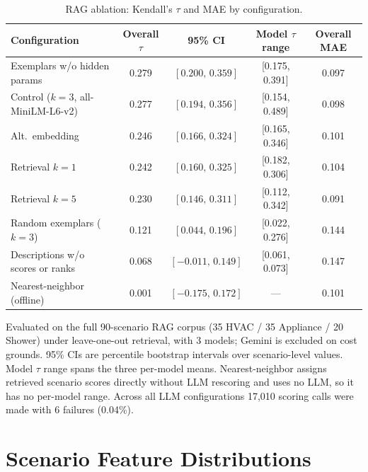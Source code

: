 \documentclass[final,3p,times]{elsarticle}
\begin{document}
\begin{table}[t]
\begin{threeparttable}
\small
\centering
\renewcommand{\arraystretch}{1.15}
\begin{tabular}{lcccc}
\toprule
Configuration & Overall $\tau$ & 95\% CI & Model $\tau$ range & Overall MAE \\
\midrule
Exemplars w/o hidden params & 0.279 & $[0.200,\, 0.359]$ & [0.175, 0.391] & 0.097 \\
Control ($k=3$, all-MiniLM-L6-v2) & 0.277 & $[0.194,\, 0.356]$ & [0.154, 0.489] & 0.098 \\
Alt.\ embedding & 0.246 & $[0.166,\, 0.324]$ & [0.165, 0.346] & 0.101 \\
Retrieval $k=1$ & 0.242 & $[0.160,\, 0.325]$ & [0.182, 0.306] & 0.104 \\
Retrieval $k=5$ & 0.230 & $[0.146,\, 0.311]$ & [0.112, 0.342] & 0.091 \\
Random exemplars ($k=3$) & 0.121 & $[0.044,\, 0.196]$ & [0.022, 0.276] & 0.144 \\
Descriptions w/o scores or ranks & 0.068 & $[-0.011,\, 0.149]$ & [0.061, 0.073] & 0.147 \\
\midrule
Nearest-neighbor (offline) & 0.001 & $[-0.175,\, 0.172]$ & --- & 0.101 \\
\bottomrule
\end{tabular}
\renewcommand{\arraystretch}{1.0}
\begin{tablenotes}
\item Evaluated on the full 90-scenario RAG corpus (35 HVAC / 35 Appliance / 20 Shower) under leave-one-out retrieval, with 3 models; Gemini is excluded on cost grounds. 95\% CIs are percentile bootstrap intervals over scenario-level values. Model $\tau$ range spans the three per-model means. Nearest-neighbor assigns retrieved scenario scores directly without LLM rescoring and uses no LLM, so it has no per-model range. Across all LLM configurations 17,010 scoring calls were made with 6 failures (0.04\%).
\end{tablenotes}
\caption{RAG ablation: Kendall's $\tau$ and MAE by configuration.}
\end{threeparttable}
\end{table}

\section{Scenario Feature Distributions}
\label{app:scenario_distributions}
\end{document}
